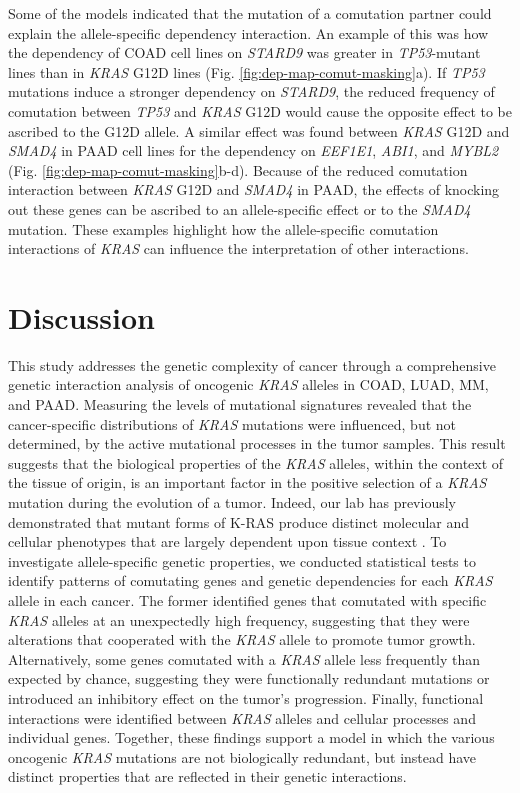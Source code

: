 \documentclass[english, 10pt, letterpaper]{article}
\newcommand{\KRAS}{\emph{KRAS}}
\newcommand{\kras}{K-RAS}
\begin{document}
Some of the models indicated that the mutation of a comutation partner could explain the allele-specific dependency interaction.
An example of this was how the dependency of COAD cell lines on \emph{STARD9} was greater in \emph{TP53}-mutant lines than in \KRAS{} G12D lines (Fig. \ref{fig:dep-map-comut-masking}a).
If \emph{TP53} mutations induce a stronger dependency on \emph{STARD9}, the reduced frequency of comutation between \emph{TP53} and \KRAS{} G12D would cause the opposite effect to be ascribed to the G12D allele.
A similar effect was found between \KRAS{} G12D and \emph{SMAD4} in PAAD cell lines for the dependency on \emph{EEF1E1}, \emph{ABI1}, and \emph{MYBL2} (Fig. \ref{fig:dep-map-comut-masking}b-d).
Because of the reduced comutation interaction between \KRAS{} G12D and \emph{SMAD4} in PAAD, the effects of knocking out these genes can be ascribed to an allele-specific effect or to the \emph{SMAD4} mutation.
These examples highlight how the allele-specific comutation interactions of \KRAS{} can influence the interpretation of other interactions.


\section*{Discussion}

This study addresses the genetic complexity of cancer through a comprehensive genetic interaction analysis of oncogenic \KRAS{} alleles in COAD, LUAD, MM, and PAAD. 
Measuring the levels of mutational signatures revealed that the cancer-specific distributions of \KRAS{} mutations were influenced, but not determined, by the active mutational processes in the tumor samples.
This result suggests that the biological properties of the \KRAS{} alleles, within the context of the tissue of origin, is an important factor in the positive selection of a \KRAS{} mutation during the evolution of a tumor.
Indeed, our lab has previously demonstrated that mutant forms of \kras{} produce distinct molecular and cellular phenotypes that are largely dependent upon tissue context \cite{Poulin2019, Brubaker2019, Johnson2019}. 
To investigate allele-specific genetic properties, we conducted statistical tests to identify patterns of comutating genes and genetic dependencies for each \KRAS{} allele in each cancer.
The former identified genes that comutated with specific \KRAS{} alleles at an unexpectedly high frequency, suggesting that they were alterations that cooperated with the \KRAS{} allele to promote tumor growth.
Alternatively, some genes comutated with a \KRAS{} allele less frequently than expected by chance, suggesting they were functionally redundant mutations or introduced an inhibitory effect on the tumor's progression.
Finally, functional interactions were identified between \KRAS{} alleles and cellular processes and individual genes.
Together, these findings support a model in which the various oncogenic \KRAS{} mutations are not biologically redundant, but instead have distinct properties that are reflected in their genetic interactions.
\end{document}
